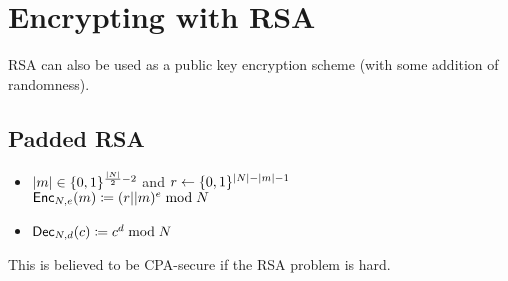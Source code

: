 \documentclass[12pt]{article}
\begin{document}
\section{Encrypting with RSA}
RSA can also be used as a public key encryption scheme (with some addition of randomness). 
\subsection{Padded RSA}
\begin{itemize}
	\item $|m| \in \{0, 1\}^{\frac{|N|}{2}-2}$ and $r\leftarrow \{0, 1\}^{|N|-|m|-1}$\\
	$\operatorname{\mathsf{Enc}}_{N,e}(m) \coloneqq (r||m)^e \bmod{N}$
	\item $\operatorname{\mathsf{Dec}}_{N,d}(c) \coloneqq c^d \bmod{N}$
\end{itemize}
This is believed to be CPA-secure if the RSA problem is hard.
\end{document}
